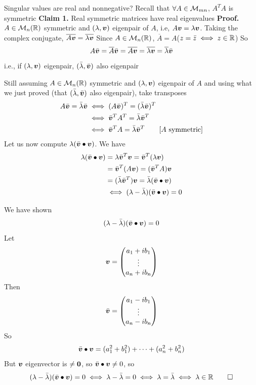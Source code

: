 \documentclass[aspectratio=169]{beamer}\usepackage[]{graphicx}\usepackage[]{xcolor}
\begin{document}
\begin{frame}{Singular values are real and nonnegative?}
Recall that $\forall A\in\mathcal{M}_{mn}$, $A^TA$ is symmetric
\vfill
\textbf{Claim 1.} Real symmetric matrices have real eigenvalues
\vfill
\textbf{Proof.} $A\in\mathcal{M}_n(\mathbb{R})$ symmetric and $(\lambda,\bm{v})$ eigenpair of $A$, i.e, $A\bm{v}=\lambda\bm{v}$. Taking the complex conjugate, $\overline{A\bm{v}}=\overline{\lambda\bm{v}}$
\vfill
Since $A\in\mathcal{M}_n(\mathbb{R})$, $\overline{A}=A$\qquad ($z=\bar z\iff z\in\mathbb{R}$)
\vfill
So
\[
A\bar{\bm{v}}=\overline{A}\bar{\bm{v}}=\overline{A\bm{v}}=\overline{\lambda\bm{v}}=\overline{\lambda}\bar{\bm{v}}
\]
i.e., if $(\lambda,\bm{v})$ eigenpair, $(\bar\lambda,\bar{\bm{v}})$ also eigenpair
\end{frame}

\begin{frame}
Still assuming $A\in\mathcal{M}_n(\mathbb{R})$ symmetric and $(\lambda,\bm{v})$ eigenpair of $A$ and using what we just proved (that $(\bar\lambda,\bar{\bm{v}})$ also eigenpair), take transposes
\begin{align*}
A\bar{\bm{v}} = \bar\lambda\bar{\bm{v}} &\iff (A\bar{\bm{v}})^T = (\bar\lambda\bar{\bm{v}})^T \\
&\iff \bar{\bm{v}}^TA^T=\bar\lambda\bar{\bm{v}}^T \\
&\iff \bar{\bm{v}}^T A = \bar\lambda\bar{\bm{v}}^T \qquad{\textrm{[$A$ symmetric]}}
\end{align*}
\vfill
Let us now compute $\lambda (\bar{\bm{v}}\bullet\bm{v})$. We have
\begin{align*}
\lambda (\bar{\bm{v}}\bullet\bm{v}) &= \lambda\bar{\bm{v}}^T\bm{v} = \bar{\bm{v}}^T(\lambda\bm{v}) \\
&= \bar{\bm{v}}^T(A\bm{v}) = (\bar{\bm{v}}^TA)\bm{v} \\
&= (\bar\lambda\bar{\bm{v}}^T)\bm{v} = \bar\lambda(\bar{\bm{v}}\bullet\bm{v}) \\
&\iff (\lambda-\bar\lambda)(\bar{\bm{v}}\bullet\bm{v}) = 0
\end{align*}
\end{frame}

\begin{frame}
We have shown
\[
(\lambda-\bar\lambda)(\bar{\bm{v}}\bullet\bm{v}) = 0
\]
Let 
\[
\bm{v} = \begin{pmatrix}
a_1+ib_1 \\
\vdots \\
a_n+ib_n
\end{pmatrix}
\]
Then
\[
\bar{\bm{v}} = \begin{pmatrix}
a_1-ib_1 \\
\vdots \\
a_n-ib_n
\end{pmatrix}
\]
So
\[
\bar{\bm{v}}\bullet\bm{v} = (a_1^2+b_1^2)+\cdots+(a_n^2+b_n^2)
\]
But $\bm{v}$ eigenvector is $\neq\b0$, so $\bar{\bm{v}}\bullet\bm{v}\neq 0$, so
\[
(\lambda-\bar\lambda)(\bar{\bm{v}}\bullet\bm{v}) = 0
\iff \lambda-\bar\lambda=0
\iff \lambda=\bar\lambda\iff \lambda\in\mathbb{R}\qed
\]
\end{frame}
\end{document}
